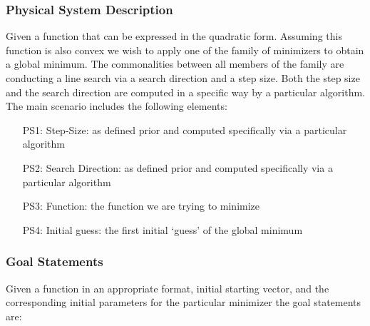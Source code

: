 \documentclass[12pt]{article}
\begin{document}
\subsubsection{Physical System Description} \label{sec_phySystDescrip}
Given a function that can be expressed in the quadratic form. Assuming this function is also convex we wish to apply one of the family of minimizers to obtain a global minimum. The commonalities between all members of the family are conducting a line search via a search direction and a step size. Both the step size and the search direction are computed in a specific way by a particular algorithm.
\\

The main scenario includes the following elements:

\begin{itemize}

\item[PS1:] Step-Size: as defined prior and computed specifically via a particular algorithm

\item[PS2:] Search Direction: as defined prior and computed specifically via a particular algorithm

\item[PS3:] Function: the function we are trying to minimize

\item[PS4:] Initial guess: the first initial `guess' of the global minimum


\end{itemize}



\subsubsection{Goal Statements}
Given a function in an appropriate format, initial starting vector, and the corresponding initial parameters for the particular minimizer the goal statements are: 

\iffalse
{}
\end{document}
